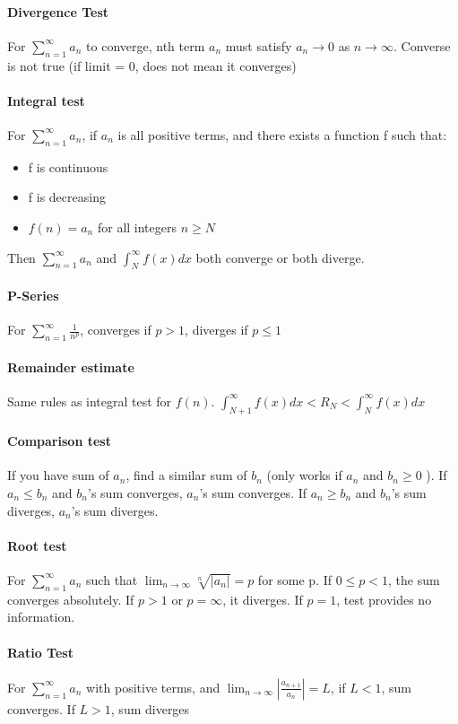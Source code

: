 \documentclass[10pt,landscape]{article}
\begin{document}
\begin{multicols}{4}
\paragraph{Divergence Test}
For $\sum_{n=1}^{\infty}a_n$ to converge, nth term $a_n$ must satisfy $a_n \rightarrow 0$ as $n \rightarrow \infty$. Converse is not true (if limit = 0, does not mean it converges)

\paragraph{Integral test}
For $\sum_{n=1}^{\infty}a_n$, if $a_n$ is all positive terms, and there exists a function f such that:

\begin{itemize}
	\item f is continuous
	\item f is decreasing
	\item $f(n) = a_n$ for all integers $n \geq N$
\end{itemize}

Then $\sum_{n=1}^{\infty}a_n$ and $\int_{N}^{\infty}f(x)dx$ both converge or both diverge.

\paragraph{P-Series}
For $\sum_{n=1}^{\infty} \frac{1}{n^p}$, converges if $p > 1$, diverges if $p \leq 1$

\paragraph{Remainder estimate}
Same rules as integral test for $f(n)$. 
$\int_{N+1}^{\infty} f(x)dx < R_N < \int_{N}^{\infty} f(x)dx$

\paragraph{Comparison test}
If you have sum of $a_n$, find a similar sum of $b_n$ (only works if $a_n$ and $b_n \geq 0$ ). If $a_n \leq b_n$ and $b_n$'s sum converges, $a_n$'s sum converges. If $a_n \geq b_n$ and $b_n$'s sum diverges, $a_n$'s sum diverges.

\paragraph{Root test}
For $\sum_{n=1}^{\infty}a_n$ such that $\lim_{n\rightarrow\infty}\sqrt[n]{|a_n|}=p$ for some p. If $0 \leq p < 1$, the sum converges absolutely. If $p > 1$ or $p = \infty$, it diverges. If $p = 1$, test provides no information.

\paragraph{Ratio Test}
For $\sum_{n=1}^{\infty}a_n$  with positive terms, and $\lim_{n\rightarrow\infty}|\frac{a_{n+1}}{a_n}| = L$, if $L < 1$, sum converges. If $L > 1$, sum diverges
		
	\end{multicols}
\end{document}
